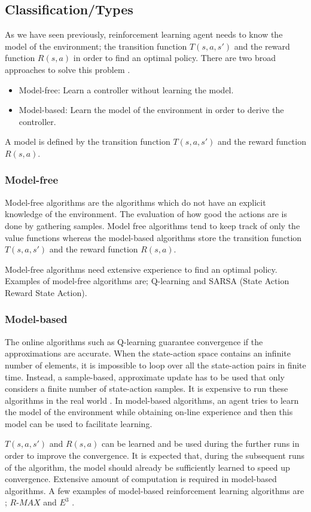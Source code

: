 \documentclass[12pt]{report}
\begin{document}
\subsection{Classification/Types}
\label{types}
As we have seen previously, reinforcement learning agent needs to know the model of the environment; the transition function $T(s,a,s')$ and the reward function $R(s,a)$ in order to find an optimal policy. There are two broad approaches to solve this problem \cite{kaelbling1996reinforcement}.
\begin{itemize}
\item Model-free: Learn a controller without learning the model.
\item Model-based: Learn the model of the environment in order to derive the controller.
\end{itemize}
A model is defined by the transition function $T(s,a,s')$ and the reward function $R(s,a)$.

\subsubsection{Model-free}
Model-free algorithms are the algorithms which do not have an explicit knowledge of the environment. The evaluation of how good the actions are is done by gathering samples. Model free algorithms tend to keep track of only the value functions whereas the model-based algorithms store the transition function $T(s,a,s')$ and the reward function $R(s,a)$. \par Model-free algorithms need extensive experience to find an optimal policy. Examples of model-free algorithms are; Q-learning \cite{watkins1992q} and SARSA (State Action Reward State Action)\cite{rummery1994line}.

\subsubsection{Model-based}
The online algorithms such as Q-learning guarantee convergence if the approximations are accurate. When the state-action space contains an infinite number of elements, it is impossible to loop over all the state-action pairs in finite time. Instead, a sample-based, approximate update has to be used that only considers a finite number of state-action samples. It is expensive to run these algorithms in the real world \cite{hester2017learning}. In model-based algorithms, an agent tries to learn the model of the environment while obtaining on-line experience and then this model can be used to facilitate learning. \par 
$T(s,a,s')$ and $R(s,a)$ can be learned and be used during the further runs in order to improve the convergence. It is expected that, during the subsequent runs of the algorithm, the model should already be sufficiently learned to speed up convergence. Extensive amount of computation is required in model-based algorithms. A few examples of model-based reinforcement learning algorithms are ;  $R$-$MAX$ \cite{brafman2002r} and $E^3$ \cite{kearns2002near}.\par 
\end{document}
